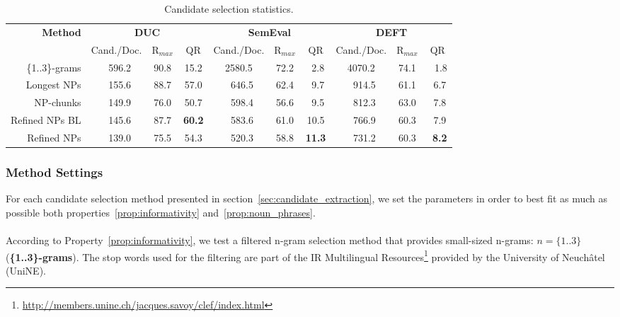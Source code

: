     \begin{table*}
      \centering
      \begin{tabular}{@{}r@{~~}c@{~}c@{~~}c@{~}c@{~}c@{~~}c@{~}c@{~}c@{~~}c@{}}
        \toprule
        \multirow{2}{*}[-2pt]{\textbf{Method}} & \multicolumn{3}{c}{\textbf{DUC}} & \multicolumn{3}{c}{\textbf{SemEval}} & \multicolumn{3}{c}{\textbf{DEFT}}\\
        \cmidrule(r){2-4}\cmidrule(r){5-7}\cmidrule{8-10}
        & Cand./Doc. & R$_{max}$ & QR & Cand./Doc. & R$_{max}$ & QR & Cand./Doc. & R$_{max}$ & QR\\
        \midrule
        \{1..3\}-grams & $~~~$596.2 & 90.8 & 15.2 & 2580.5 & 72.2 & $~~$2.8 & 4070.2 & 74.1 & $~~~$1.8\\
        Longest NPs & $~~~$155.6 & 88.7 & 57.0 & $~~~$646.5 & 62.4 & $~~$9.7 & $~~~$914.5 & 61.1 & $~~$6.7\\
        NP-chunks & $~~~$149.9 & 76.0 & 50.7 & $~~~$598.4 & 56.6 & $~~$9.5 & $~~~$812.3 & 63.0 & $~~$7.8\\
        Refined NPs BL & $~~~$145.6 & 87.7 & \textbf{60.2} & $~~~$583.6 & 61.0 & 10.5 & $~~~$766.9 & 60.3 & $~~$7.9\\
        Refined NPs & $~~~$139.0 & 75.5 & 54.3 & $~~~$520.3 & 58.8 & \textbf{11.3} & $~~~$731.2 & 60.3 & \textbf{$~~$8.2}\\
        \bottomrule
      \end{tabular}
      \caption{Candidate selection statistics.
               \label{tab:candidate_extraction_statistics}}
    \end{table*}

    \subsubsection{Method Settings}
    \label{subsubsec:method_settings}
      For each candidate selection method presented in
      section~\ref{sec:candidate_extraction}, we set the parameters in order to
      best fit as much as possible both properties~\ref{prop:informativity}
      and~\ref{prop:noun_phrases}.

      \paragraph{}
      According to Property~\ref{prop:informativity}, we test a filtered n-gram
      selection method that provides small-sized n-grams: $n = \{1..3\}$
      (\textbf{\{1..3\}-grams}). The stop words used for the filtering are part
      of the IR Multilingual
      Resources\footnote{\url{http://members.unine.ch/jacques.savoy/clef/index.html}}
      provided by the University of Neuchâtel (UniNE).

